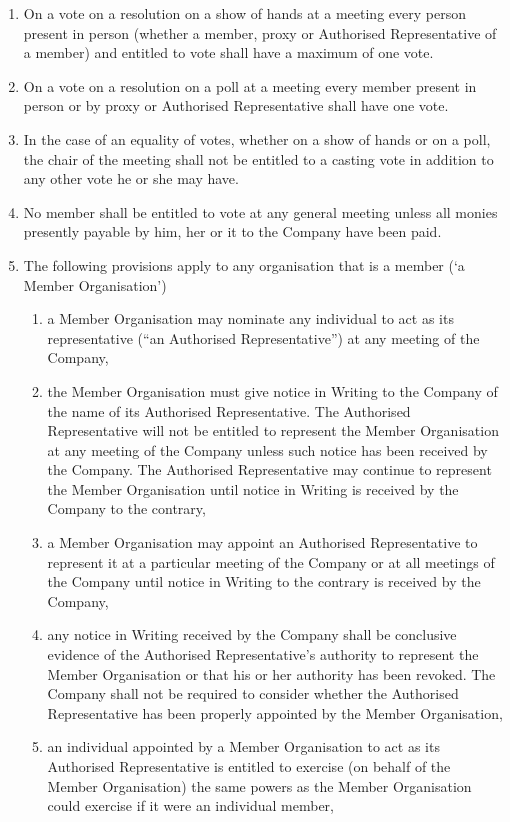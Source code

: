 \documentclass[a4paper,12pt]{article}
\begin{document}
\begin{enumerate}
  \item On a vote on a resolution on a show of hands at a meeting every person present in person (whether a member, proxy or Authorised Representative of a member) and entitled to vote shall have a maximum of one vote.
  \item On a vote on a resolution on a poll at a meeting every member present in person or by proxy or Authorised Representative shall have one vote.
  \item In the case of an equality of votes, whether on a show of hands or on a poll, the chair of the meeting shall not be entitled to a casting vote in addition to any other vote he or she may have.
  \item No member shall be entitled to vote at any general meeting unless all monies presently payable by him, her or it to the Company have been paid.
  \item The following provisions apply to any organisation that is a member (`a Member Organisation')
  \begin{enumerate}
    \item a Member Organisation may nominate any individual to act as its representative (“an Authorised Representative”) at any meeting of the Company,
    \item the Member Organisation must give notice in Writing to the Company of the name of its Authorised Representative. The Authorised Representative will not be entitled to represent the Member Organisation at any meeting of the Company unless such notice has been received by the Company. The Authorised Representative may continue to represent the Member Organisation until notice in Writing is received by the Company to the contrary,
    \item a Member Organisation may appoint an Authorised Representative to represent it at a particular meeting of the Company or at all meetings of the Company until notice in Writing to the contrary is received by the Company,
    \item any notice in Writing received by the Company shall be conclusive evidence of the Authorised Representative's authority to represent the Member Organisation or that his or her authority has been revoked.  The Company shall not be required to consider whether the Authorised Representative has been properly appointed by the Member Organisation,
    \item an individual appointed by a Member Organisation to act as its Authorised Representative is entitled to exercise (on behalf of the Member Organisation) the same powers as the Member Organisation could exercise if it were an individual member,

\end{enumerate}
\end{enumerate}
\end{document}
